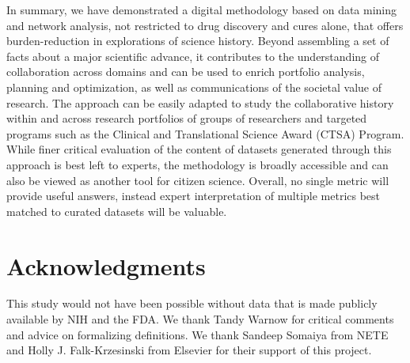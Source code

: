 \documentclass[10pt,letterpaper]{article}
\begin{document}
In summary, we have demonstrated a digital methodology based on data mining and network analysis, not restricted to  drug discovery and cures alone, that offers burden-reduction in explorations of science history. Beyond assembling a set of facts about a major scientific advance, it contributes to the understanding of collaboration across domains and can be used to  enrich portfolio analysis, planning and optimization, as well as communications of the societal value of research. The approach can be easily adapted to study the collaborative history within and across research portfolios of groups of researchers and targeted programs such as the Clinical and Translational Science Award (CTSA) Program. While finer critical evaluation of the content of datasets generated through this approach is best left to experts, the methodology is broadly accessible and can also be viewed as another tool for citizen science. Overall, no single metric will provide useful answers, instead expert interpretation of multiple metrics best matched to curated datasets will be valuable.

 \nolinenumbers
 
 \section*{Acknowledgments}  This study would not have been possible without data that is made publicly available by NIH and the FDA. We thank Tandy Warnow for critical comments and advice on formalizing definitions. We thank Sandeep Somaiya from NETE and Holly J. Falk-Krzesinski from Elsevier for their support of this project.
 
\end{document}
